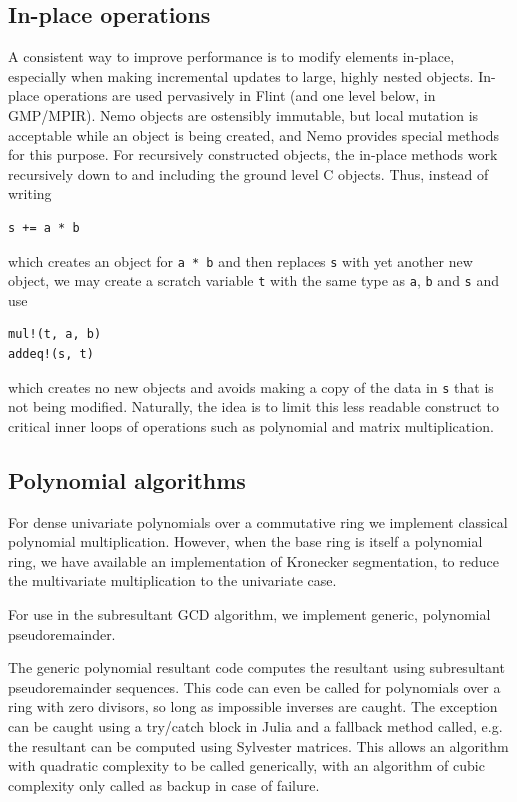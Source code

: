 \documentclass{sig-alternate-05-2015}
\begin{document}
\subsection{In-place operations}

A consistent way to improve performance is to modify
elements in-place, especially when making incremental updates
to large, highly nested objects.
In-place operations are used pervasively in Flint (and one level below, in GMP/MPIR).
Nemo objects are ostensibly immutable, but local mutation is
acceptable while an object is being created,
and Nemo provides special methods for this purpose.
For recursively constructed objects, the in-place methods work
recursively down to and including the ground level C objects.
Thus, instead of writing
\begin{verbatim}
s += a * b
\end{verbatim}
which creates an object for \texttt{a * b}
and then replaces \texttt{s} with yet another new object, we may
create a scratch variable \texttt{t} with the same type as \texttt{a}, \texttt{b} and \texttt{s} and use
\begin{verbatim}
mul!(t, a, b)
addeq!(s, t)
\end{verbatim}
which creates no new objects and avoids making a copy of the data in \texttt{s}
that is not being modified.
Naturally, the idea is to limit this less readable construct to
critical inner loops of operations such as polynomial
and matrix multiplication.

\subsection{Polynomial algorithms}

For dense univariate polynomials over a commutative ring we implement classical
polynomial multiplication. However, when the base ring is itself a polynomial ring,
we have available an implementation of Kronecker segmentation, to reduce the
multivariate multiplication to the univariate case.

For use in the subresultant GCD algorithm, we implement generic, polynomial
pseudoremainder. 

The generic polynomial resultant code computes the resultant using subresultant
pseudoremainder sequences. This code can even be called for polynomials over a
ring with zero divisors, so long as impossible inverses are caught. The exception
can be caught using a try/catch block in Julia and a fallback method called, e.g.
the resultant can be computed using Sylvester matrices. This allows an algorithm
with quadratic complexity to be called generically, with an algorithm of cubic
complexity only called as backup in case of failure.
\end{document}
